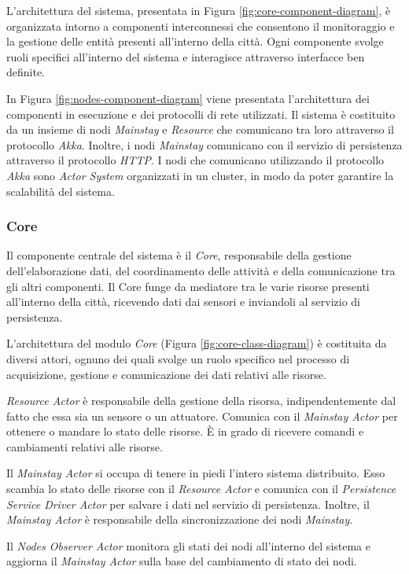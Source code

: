 \documentclass{scrartcl}
\begin{document}
L'architettura del sistema, presentata in Figura \ref{fig:core-component-diagram}, è organizzata intorno a componenti interconnessi che consentono il monitoraggio e la gestione delle entità presenti all'interno della città. Ogni componente svolge ruoli specifici all'interno del sistema e interagisce attraverso interfacce ben definite.

In Figura \ref{fig:nodes-component-diagram} viene presentata l'architettura dei componenti in esecuzione e dei protocolli di rete utilizzati. Il sistema è costituito da un insieme di nodi \textit{Mainstay} e \textit{Resource} che comunicano tra loro attraverso il protocollo \textit{Akka}. Inoltre, i nodi \textit{Mainstay} comunicano con il servizio di persistenza attraverso il protocollo \textit{HTTP}.
I nodi che comunicano utilizzando il protocollo \textit{Akka} sono \textit{Actor System} organizzati in un cluster, in modo da poter garantire la scalabilità del sistema.

\subsubsection{Core}
Il componente centrale del sistema è il \textit{Core}, responsabile della gestione dell'elaborazione dati, del coordinamento delle attività e della comunicazione tra gli altri componenti. Il Core funge da mediatore tra le varie risorse presenti all'interno della città, ricevendo dati dai sensori e inviandoli al servizio di persistenza.

L'architettura del modulo \textit{Core} (Figura \ref{fig:core-class-diagram}) è costituita da diversi attori, ognuno dei quali svolge un ruolo specifico nel processo di acquisizione, gestione e comunicazione dei dati relativi alle risorse.

\textit{Resource Actor} è responsabile della gestione della risorsa, indipendentemente dal fatto che essa sia un sensore o un attuatore. Comunica con il \textit{Mainstay Actor} per ottenere o mandare lo stato delle risorse. È in grado di ricevere comandi e cambiamenti relativi alle risorse.

Il \textit{Mainstay Actor} si occupa di tenere in piedi l'intero sistema distribuito. Esso scambia lo stato delle risorse con il \textit{Resource Actor} e comunica con il \textit{Persistence Service Driver Actor} per salvare i dati nel servizio di persistenza. Inoltre, il \textit{Mainstay Actor} è responsabile della sincronizzazione dei nodi \textit{Mainstay}.

Il \textit{Nodes Observer Actor} monitora gli stati dei nodi all'interno del sistema e aggiorna il \textit{Mainstay Actor} sulla base del cambiamento di stato dei nodi.
\end{document}

